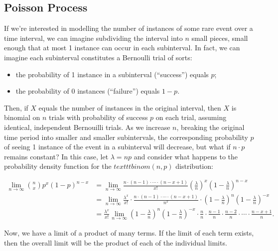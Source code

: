 \documentclass[
]{book}
\providecommand{\tightlist}{%
  \setlength{\itemsep}{0pt}\setlength{\parskip}{0pt}}
\theoremstyle{definition}
\theoremstyle{definition}
\theoremstyle{definition}
\theoremstyle{definition}
\theoremstyle{remark}
\begin{document}
\subsection{Poisson Process}\label{poisson-process}

If we're interested in modelling the number of instances of some rare event over a time interval, we can imagine subdividing the interval into \(n\) small pieces, small enough that at most 1 instance can occur in each subinterval. In fact, we can imagine each subinterval constitutes a Bernoulli trial of sorts:

\begin{itemize}
\tightlist
\item
  the probability of 1 instance in a subinterval (``success'') equals \(p\);
\item
  the probability of 0 instances (``failure'') equals \(1-p\).
\end{itemize}

Then, if \(X\) equals the number of instances in the original interval, then \(X\) is binomial on \(n\) trials with probability of success \(p\) on each trial, assuming identical, independent Bernouilli trials. As we increase \(n\), breaking the original time period into smaller and smaller subintervals, the corresponding probability \(p\) of seeing 1 instance of the event in a subinterval will decrease, but what if \(n \cdot p\) remains constant? In this case, let \(\lambda = np\) and consider what happens to the probability density function for the \(texttt{binom}(n,p)\) distribution:

\begin{align*}
\lim_{n \to \infty} \binom{n}{x}p^x(1-p)^{n-x} &= \lim_{n \to \infty} \frac{n\cdot(n-1)\cdot \cdots \cdot (n - x + 1)}{x!} \left(\frac{\lambda}{n}\right)^x\left(1-\frac{\lambda}{n}\right)^{n-x} \\
  &=\lim_{n \to \infty} \frac{\lambda^x}{x!}\cdot\frac{n\cdot(n-1)\cdot \cdots \cdot (n - x + 1)}{n^x}\cdot\left(1-\frac{\lambda}{n}\right)^{n}\left(1-\frac{\lambda}{n}\right)^{-x}\\
  &=\frac{\lambda^x}{x!}\lim_{n \to \infty}\left(1-\frac{\lambda}{n}\right)^{n}\left(1-\frac{\lambda}{n}\right)^{-x} \cdot \frac{n}{n} \cdot \frac{n-1}{n} \cdot \frac{n-2}{n} \cdot \cdots \cdot \frac{n-x+1}{n}.
\end{align*}

Now, we have a limit of a product of many terms. If the limit of each term exists, then the overall limit will be the product of each of the individual limits.
\end{document}
